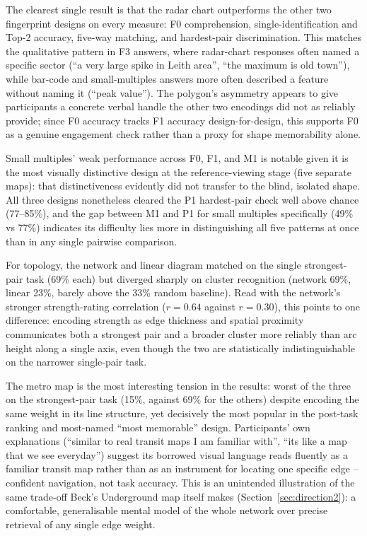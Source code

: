 \documentclass[logo,msc]{infthesis}
\begin{document}
The clearest single result is that the radar chart outperforms the other two fingerprint designs on every measure: F0 comprehension, single-identification and Top-2 accuracy, five-way matching, and hardest-pair discrimination. This matches the qualitative pattern in F3 answers, where radar-chart responses often named a specific sector (``a very large spike in Leith area'', ``the maximum is old town''), while bar-code and small-multiples answers more often described a feature without naming it (``peak value''). The polygon's asymmetry appears to give participants a concrete verbal handle the other two encodings did not as reliably provide; since F0 accuracy tracks F1 accuracy design-for-design, this supports F0 as a genuine engagement check rather than a proxy for shape memorability alone.

Small multiples' weak performance across F0, F1, and M1 is notable given it is the most visually distinctive design at the reference-viewing stage (five separate maps): that distinctiveness evidently did not transfer to the blind, isolated shape. All three designs nonetheless cleared the P1 hardest-pair check well above chance (77--85\%), and the gap between M1 and P1 for small multiples specifically (49\% vs 77\%) indicates its difficulty lies more in distinguishing all five patterns at once than in any single pairwise comparison.

For topology, the network and linear diagram matched on the single strongest-pair task (69\% each) but diverged sharply on cluster recognition (network 69\%, linear 23\%, barely above the 33\% random baseline). Read with the network's stronger strength-rating correlation ($r=0.64$ against $r=0.30$), this points to one difference: encoding strength as edge thickness and spatial proximity communicates both a strongest pair and a broader cluster more reliably than arc height along a single axis, even though the two are statistically indistinguishable on the narrower single-pair task.

The metro map is the most interesting tension in the results: worst of the three on the strongest-pair task (15\%, against 69\% for the others) despite encoding the same weight in its line structure, yet decisively the most popular in the post-task ranking and most-named ``most memorable'' design. Participants' own explanations (``similar to real transit maps I am familiar with'', ``its like a map that we see everyday'') suggest its borrowed visual language reads fluently as a familiar transit map rather than as an instrument for locating one specific edge -- confident navigation, not task accuracy. This is an unintended illustration of the same trade-off Beck's Underground map itself makes (Section~\ref{sec:direction2}): a comfortable, generalisable mental model of the whole network over precise retrieval of any single edge weight.
\end{document}

